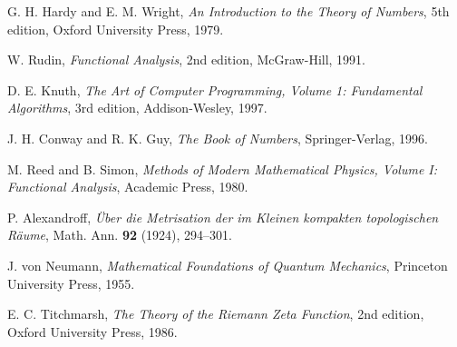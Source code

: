 \documentclass[12pt]{article}
\theoremstyle{plain}
\theoremstyle{definition}
\begin{document}
\begin{thebibliography}{9}

G. H. Hardy and E. M. Wright, \textit{An Introduction to the Theory of Numbers}, 5th edition, Oxford University Press, 1979.

W. Rudin, \textit{Functional Analysis}, 2nd edition, McGraw-Hill, 1991.

D. E. Knuth, \textit{The Art of Computer Programming, Volume 1: Fundamental Algorithms}, 3rd edition, Addison-Wesley, 1997.

J. H. Conway and R. K. Guy, \textit{The Book of Numbers}, Springer-Verlag, 1996.

M. Reed and B. Simon, \textit{Methods of Modern Mathematical Physics, Volume I: Functional Analysis}, Academic Press, 1980.

P. Alexandroff, \textit{Über die Metrisation der im Kleinen kompakten topologischen Räume}, Math. Ann. \textbf{92} (1924), 294--301.

J. von Neumann, \textit{Mathematical Foundations of Quantum Mechanics}, Princeton University Press, 1955.

E. C. Titchmarsh, \textit{The Theory of the Riemann Zeta Function}, 2nd edition, Oxford University Press, 1986.

\end{thebibliography}
\end{document}
